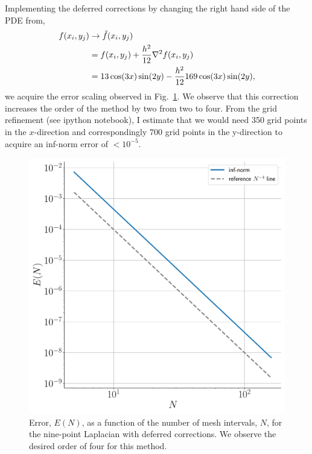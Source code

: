 \documentclass[12pt]{article}
\begin{document}
\FloatBarrier

Implementing the deferred corrections by changing the right hand side of the PDE from,
\begin{subequations}
	\begin{align}
		f(x_{i},y_{j})&\to \tilde{f}(x_{i},y_{j})\\
		&= f(x_{i},y_{j}) + \dfrac{h^{2}}{12}\laplacian{f(x_{i},y_{j})}\\
		&= 13\cos(3x)\sin(2y) - \dfrac{h^{2}}{12}169\cos(3x)\sin(2y),
	\end{align}
\end{subequations}
we acquire the error scaling observed in Fig.~\ref{fig:nine_pt_deferred_err_scaling}. We observe that this correction increases the order of the method by two from two to four. From the grid refinement (see ipython notebook), I estimate that we would need 350 grid points in the $x$-direction and correspondingly $700$ grid points in the y-direction to acquire an inf-norm error of $< 10^{-5}$.

\begin{figure}[!h]
	\centering
	\includegraphics[clip,scale=0.4]{q2b_deferred_err_fig.pdf}
	\caption{Error, $E(N)$, as a function of the number of mesh intervals, $N$, for the nine-point Laplacian with deferred corrections. We observe the desired order of four for this method.}
	\label{fig:nine_pt_deferred_err_scaling}
\end{figure}
\end{document}
